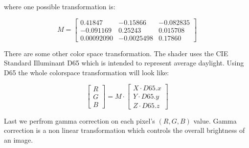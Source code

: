 where one possible transformation is: 

\begin{equation}
M = \begin{bmatrix} 0.41847 & -0.15866 & -0.082835\\ -0.091169 & 0.25243 & 0.015708\\ 0.00092090 & -0.0025498 & 0.17860 \end{bmatrix}
\end{equation}

There are some other color space transformation. The shader uses the CIE Standard Illuminant D65 which is intended to represent average daylight. Using D65 the whole colorspace transformation will look like:

\begin{equation}
\begin{bmatrix}R\\G\\B\end{bmatrix} = M \cdot \begin{bmatrix}X \cdot D65.x \\ Y \cdot D65.y \\Z \cdot D65.z \end{bmatrix} 
\end{equation}

Last we perfrom gamma correction on each pixel's $(R,G,B)$ value. Gamma correction is a non linear transformation which controls the overall brightness of an image.

